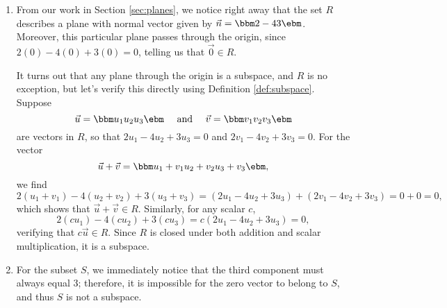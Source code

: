 \medskip

{\begin{enumerate}
\item From our work in Section \ref{sec:planes}, we notice right away that the set $R$ describes a plane with normal vector given by $\vec n = \bbm 2\\-4\\3\ebm$. Moreover, this particular plane passes through the origin, since $2(0)-4(0)+3(0)=0$, telling us that $\vec 0 \in R$.

It turns out that any plane through the origin is a subspace, and $R$ is no exception, but let's verify this directly using Definition \ref{def:subspace}. Suppose 
\[
\vec u = \bbm u_1\\u_2\\u_3\ebm \quad \text{ and } \quad \vec v = \bbm v_1\\v_2\\v_3\ebm
\]
are vectors in $R$, so that $2u_1-4u_2+3u_3=0$ and $2v_1-4v_2+3v_3=0$. For the vector
\[
\vec u + \vec v = \bbm u_1+v_1\\u_2+v_2\\u_3+v_3\ebm,
\]
we find
\[
2(u_1+v_1)-4(u_2+v_2)+3(u_3+v_3) = (2u_1-4u_2+3u_3) + (2v_1-4v_2+3v_3) = 0 + 0 = 0,
\]
which shows that $\vec u+\vec v\in R$. Similarly, for any scalar $c$,
\[
2(cu_1)-4(cu_2)+3(cu_3) = c(2u_1-4u_2+3u_3) = 0,
\]
verifying that $c\vec u \in R$. Since $R$ is closed under both addition and scalar multiplication, it is a subspace.

\item For the subset $S$, we immediately notice that the third component must always equal 3; therefore, it is impossible for the zero vector to belong to $S$, and thus $S$ is not a subspace.
\end{enumerate}}

